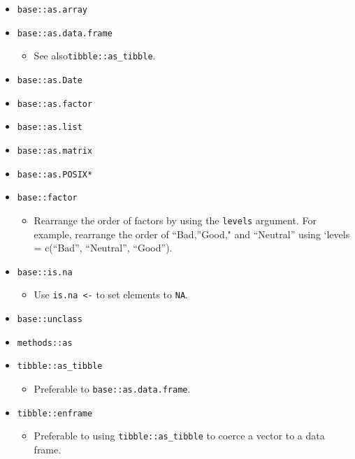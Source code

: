 \documentclass[
]{book}
\providecommand{\tightlist}{%
  \setlength{\itemsep}{0pt}\setlength{\parskip}{0pt}}
\begin{document}
\begin{itemize}
\tightlist
\item
  \texttt{base::as.array}
\item
  \texttt{base::as.data.frame}

  \begin{itemize}
  \tightlist
  \item
    See also\texttt{tibble::as\_tibble}.
  \end{itemize}
\item
  \texttt{base::as.Date}
\item
  \texttt{base::as.factor}
\item
  \texttt{base::as.list}
\item
  \texttt{base::as.matrix}
\item
  \texttt{base::as.POSIX*}
\item
  \texttt{base::factor}

  \begin{itemize}
  \tightlist
  \item
    Rearrange the order of factors by using the \texttt{levels} argument. For example, rearrange the order of ``Bad,''Good," and ``Neutral'' using `levels = c(``Bad'', ``Neutral'', ``Good'').
  \end{itemize}
\item
  \texttt{base::is.na}

  \begin{itemize}
  \tightlist
  \item
    Use \texttt{is.na\ \textless{}-} to set elements to \texttt{NA}.
  \end{itemize}
\item
  \texttt{base::unclass}
\item
  \texttt{methods::as}
\item
  \texttt{tibble::as\_tibble}

  \begin{itemize}
  \tightlist
  \item
    Preferable to \texttt{base::as.data.frame}.
  \end{itemize}
\item
  \texttt{tibble::enframe}

  \begin{itemize}
  \tightlist
  \item
    Preferable to using \texttt{tibble::as\_tibble} to coerce a vector to a data frame.
  \end{itemize}
\end{itemize}
\end{document}
